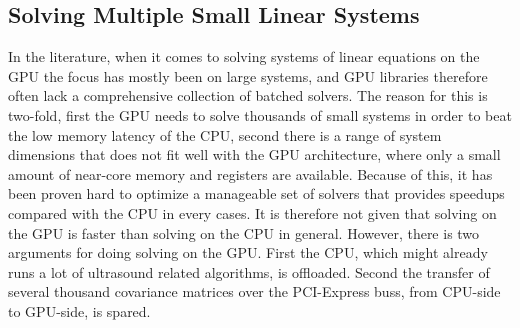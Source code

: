 \documentclass[12pt,journal,onecolumn]{IEEEtran}
\begin{document}

\subsection{Solving Multiple Small Linear Systems}
In the literature, when it comes to solving systems of linear equations on the GPU the focus has mostly been on large systems, and GPU libraries therefore often lack a comprehensive collection of batched solvers. The reason for this is two-fold, first the GPU needs to solve thousands of small systems in order to beat the low memory latency of the CPU, second there is a range of system dimensions that does not fit well with the GPU architecture, where only a small amount of near-core memory and registers are available. Because of this, it has been proven hard to optimize a manageable set of solvers that provides speedups compared with the CPU in every cases. It is therefore not given that solving on the GPU is faster than solving on the CPU in general. However, there is two arguments for doing solving on the GPU. First the CPU, which might already runs a lot of ultrasound related algorithms, is offloaded. Second the transfer of several thousand covariance matrices over the PCI-Express buss, from CPU-side to GPU-side, is spared.
\end{document}
